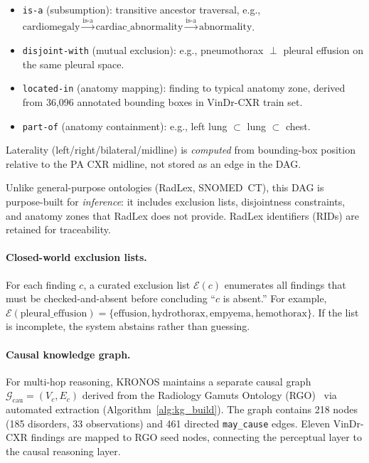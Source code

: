 \documentclass[runningheads]{llncs}
\begin{document}
\begin{itemize}
  \item \texttt{is-a} (subsumption): transitive ancestor traversal, e.g.,
    $\text{cardiomegaly} \xrightarrow{\text{is-a}} \text{cardiac\_abnormality}
    \xrightarrow{\text{is-a}} \text{abnormality}$.
  \item \texttt{disjoint-with} (mutual exclusion): e.g., pneumothorax
    $\perp$ pleural effusion on the same pleural space.
  \item \texttt{located-in} (anatomy mapping): finding to typical anatomy
    zone, derived from 36{,}096 annotated bounding boxes in VinDr-CXR
    train set.
  \item \texttt{part-of} (anatomy containment): e.g., left lung
    $\subset$ lung $\subset$ chest.
\end{itemize}

\noindent
Laterality (left/right/bilateral/midline) is \emph{computed} from
bounding-box position relative to the PA CXR midline, not stored as an
edge in the DAG.

\noindent
Unlike general-purpose ontologies (RadLex, SNOMED~CT), this DAG is
purpose-built for \emph{inference}: it includes exclusion lists,
disjointness constraints, and anatomy zones that RadLex does not provide.
RadLex identifiers (RIDs) are retained for traceability.

\paragraph{Closed-world exclusion lists.}
For each finding $c$, a curated exclusion list $\mathcal{E}(c)$ enumerates
all findings that must be checked-and-absent before concluding
``$c$ is absent.''
For example, $\mathcal{E}(\text{pleural\_effusion}) = \{\text{effusion},
\text{hydrothorax}, \text{empyema}, \text{hemothorax}\}$.
If the list is incomplete, the system abstains rather than guessing.

\paragraph{Causal knowledge graph.}
For multi-hop reasoning, KRONOS maintains a separate causal graph
$\mathcal{G}_{\text{cau}} = (V_c, E_c)$ derived from the Radiology
Gamuts Ontology (RGO)~\cite{budovec2014rgo} via automated extraction
(Algorithm~\ref{alg:kg_build}).
The graph contains 218 nodes (185 disorders, 33 observations) and 461
directed \texttt{may\_cause} edges.
Eleven VinDr-CXR findings are mapped to RGO seed nodes, connecting
the perceptual layer to the causal reasoning layer.
\end{document}
